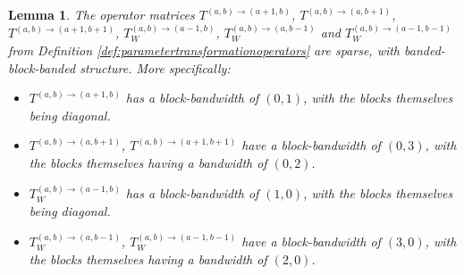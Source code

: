 \documentclass[11pt, oneside]{article}   	%
\newtheorem{lemma}{Lemma}
\begin{document}
\begin{lemma}\label{lemma:sparsityofparametertransformationoperators}
The operator matrices $T^{(a,b)\to(a+1,b)}$, $T^{(a,b)\to(a,b+1)}$, $T^{(a,b)\to(a+1,b+1)}$, $T_W^{(a,b)\to(a-1,b)}$, $T_W^{(a,b)\to(a,b-1)}$ and $T_W^{(a,b)\to(a-1,b-1)}$ from Definition \ref{def:parametertransformationoperators} are sparse, with banded-block-banded structure. More specifically:
\begin{itemize}
	\item $T^{(a,b)\to(a+1,b)}$ has a block-bandwidth of $(0,1)$, with the blocks themselves being diagonal.
  	\item $T^{(a,b)\to(a,b+1)}$, $T^{(a,b)\to(a+1,b+1)}$ have a block-bandwidth of $(0,3)$, with the blocks themselves having a bandwidth of $(0,2)$.
	\item $T_W^{(a,b)\to(a-1,b)}$ has a block-bandwidth of $(1,0)$, with the blocks themselves being diagonal.
  	\item $T_W^{(a,b)\to(a,b-1)}$, $T_W^{(a,b)\to(a-1,b-1)}$ have a block-bandwidth of $(3,0)$, with the blocks themselves having a bandwidth of $(2,0)$.
\end{itemize}
\end{lemma}
\end{document}
